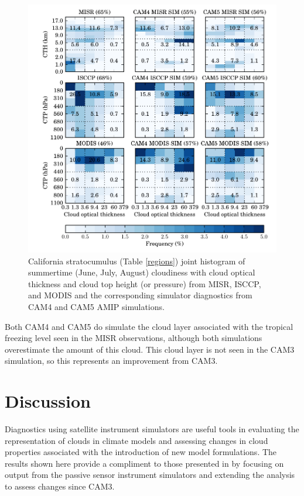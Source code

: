 \begin{figure}
    \centering
    \includegraphics{../graphics/hist2d_camamip_twp.pdf}
    \caption[Tropical western Pacific joint histogram of summertime cloudiness with cloud optical thickness and cloud top height from MISR, ISCCP, and MODIS and the corresponding simulator diagnostics from CAM4 and CAM5 AMIP simulations.]{California stratocumulus (Table \ref{regions}) joint histogram of summertime (June, July, August) cloudiness with cloud optical thickness and cloud top height (or pressure) from MISR, ISCCP, and MODIS and the corresponding simulator diagnostics from CAM4 and CAM5 AMIP simulations.}
    \label{jointHist_camamip_TropicalWPacific_JJA}
\end{figure}

Both CAM4 and CAM5 do simulate the cloud layer associated with the tropical freezing level \citep{johnson_et_al_1999} seen in the MISR observations, although both simulations overestimate the amount of this cloud. This cloud layer is not seen in the CAM3 simulation, so this represents an improvement from CAM3.

\section{Discussion}
Diagnostics using satellite instrument simulators are useful tools in evaluating the representation of clouds in climate models and assessing changes in cloud properties associated with the introduction of new model formulations. The results shown here provide a compliment to those presented in \cite{kay_et_al_2011} by focusing on output from the passive sensor instrument simulators and extending the analysis to assess changes since CAM3.

